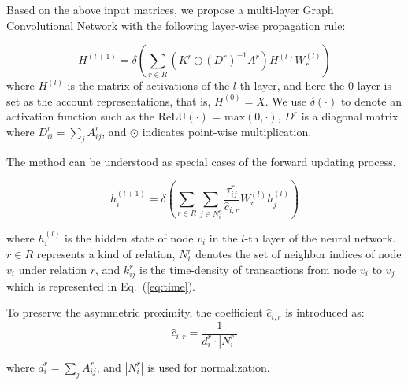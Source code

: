 Based on the above input matrices, we propose a multi-layer Graph Convolutional Network with the following layer-wise propagation rule:

\begin{equation}
H^{(l+1)}=\delta(\sum_{r\in R} (K^r\odot (D^r)^{-1}A^r)H^{(l)}W_r^{(l)})
\end{equation}
\noindent where $H^{(l)}$ is the matrix of activations of the $l$-th layer, and here the $0$ layer is set as the account representations, that is, $H^{(0)}=X$. We use $\delta(\cdot)$ to denote an activation function such as the ReLU$(\cdot)$ = max$(0,\cdot)$, $D^r$ is a diagonal matrix where $D^r_{ii}=\sum_{j}A^r_{ij}$, and $\odot$ indicates point-wise multiplication.


The method can be understood as special cases of the forward updating process.

\begin{equation}
h_i^{(l+1)}=\delta(\sum_{r\in R} \sum_{j \in N_i^r} \frac{\tau_{ij}^r}{\hat c_{i,r}}W_r^{(l)}h_j^{(l)})
\end{equation}

\noindent where $h_i^{(l)}$ is the hidden state of node $v_i$ in the $l$-th layer of the neural network. $r \in R$ represents a kind of relation, $N_i^r$ denotes the set of neighbor indices of node $v_i$ under relation $r$, and $k_{ij}^r$ is the time-density of transactions from node $v_i$ to $v_j$ which is represented in Eq.~(\ref{eq:time}). 

To preserve the asymmetric proximity, the coefficient $\hat c_{i,r}$ is introduced as:
\begin{equation}
\hat c_{i,r}=\frac{1}{d_i^r\cdot |N_i^r|}
\end{equation}

\noindent where $d_i^r=\sum_{j}A^r_{ij}$, and $|N_i^r|$ is used for normalization.




